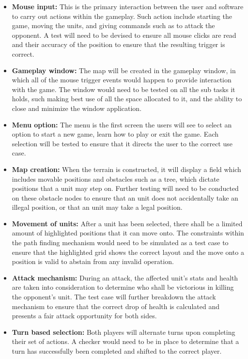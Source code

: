 \documentclass{article}
\begin{document}
\begin{itemize}
    \item \textbf{Mouse input:} This is the primary interaction between the user and software to carry out actions within the gameplay. Such action include starting the game, moving the units, and giving commands such as to attack the opponent. A test will need to be devised to ensure all mouse clicks are read and their accuracy of the position to ensure that the resulting trigger is correct.
    \item \textbf{Gameplay window:} The map will be created in the gameplay window, in which all of the mouse trigger events would happen to provide interaction with the game. The window would need to be tested on all the sub tasks it holds, such making best use of all the space allocated to it, and the ability to close and minimize the window application.
    \item \textbf{Menu option:} The menu is the first screen the users will see to select an option to start a new game, learn how to play or exit the game. Each selection will be tested to ensure that it directs the user to the correct use case.
    \item \textbf{Map creation:} When the terrain is constructed, it will display a field which includes movable positions and obstacles such as a tree, which dictate positions that a unit may step on. Further testing will need to be conducted on these obstacle nodes to ensure that an unit does not accidentally take an illegal position, or that an unit may take a legal position.
    \item \textbf{Movement of units:} After a unit has been selected, there shall be a limited amount of highlighted positions that it can move onto. The constraints within the path finding mechanism would need to be simulated as a test case to ensure that the highlighted grid shows the correct layout and the move onto a position is valid to abstain from any invalid operation.
    \item \textbf{Attack mechanism:} During an attack, the affected unit's stats and health are taken into consideration to determine who shall be victorious in killing the opponent's unit.
    The test case will further breakdown the attack mechanism to ensure that the correct drop of health is calculated and presents a fair attack opportunity for both sides.
    \item \textbf{Turn based selection:} Both players will alternate turns upon completing their set of actions. A checker would need to be in place to determine that a turn has successfully been completed and shifted to the correct player.
\end{itemize}
\end{document}
